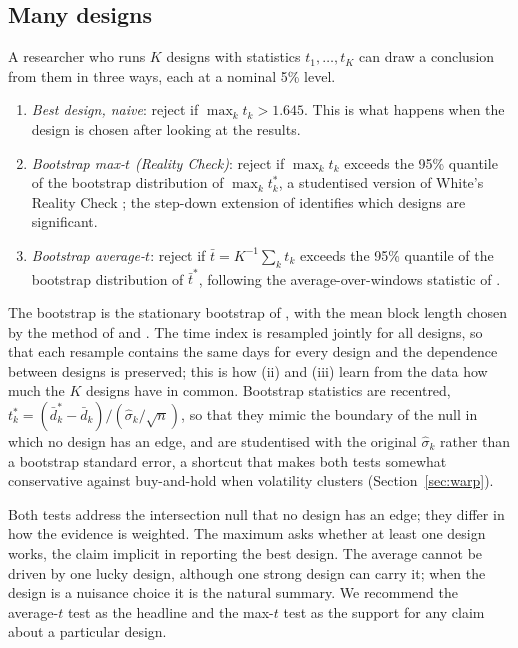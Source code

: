 \documentclass[pdflatex,sn-basic]{sn-jnl}
\theoremstyle{thmstyleone}
\theoremstyle{thmstylethree}
\begin{document}
\subsection{Many designs}\label{sec:manydesigns}

A researcher who runs $K$ designs with statistics $t_1,\dots,t_K$ can draw a conclusion from them in
three ways, each at a nominal 5\% level.

\begin{enumerate}
\item[(i)] \emph{Best design, naive}: reject if $\max_k t_k>1.645$. This is what happens when the design is
chosen after looking at the results.
\item[(ii)] \emph{Bootstrap max-$t$ (Reality Check)}: reject if $\max_k t_k$ exceeds the 95\% quantile of the
bootstrap distribution of $\max_k t^*_k$, a studentised version of White's Reality Check
\citep{white2000}; the step-down extension of \citet{romano2005} identifies which designs are
significant.
\item[(iii)] \emph{Bootstrap average-$t$}: reject if $\bar t=K^{-1}\sum_k t_k$ exceeds the 95\% quantile of the
bootstrap distribution of $\bar t^*$, following the average-over-windows statistic of
\citet{rossi2012}.
\end{enumerate}

The bootstrap is the stationary bootstrap of \citet{politis1994}, with the mean block length chosen
by the method of \citet{politis2004} and \citet{patton2009}. The time index is resampled jointly for
all designs, so that each resample contains the same days for every design and the dependence between
designs is preserved; this is how (ii) and (iii) learn from the data how much the $K$ designs have in
common. Bootstrap statistics are recentred, $t^*_k=(\bar d^{*}_k-\bar d_k)/(\hat\sigma_k/\sqrt n)$, so
that they mimic the boundary of the null in which no design has an edge, and are studentised with the
original $\hat\sigma_k$ rather than a bootstrap standard error, a shortcut that makes both tests
somewhat conservative against buy-and-hold when volatility clusters (Section~\ref{sec:warp}).

Both tests address the intersection null that no design has an edge; they differ in how the evidence
is weighted. The maximum asks whether at least one design works, the claim implicit in reporting the
best design. The average cannot be driven by one lucky design, although one strong design can carry
it; when the design is a nuisance choice it is the natural summary. We recommend the average-$t$ test
as the headline and the max-$t$ test as the support for any claim about a particular design.
\end{document}
